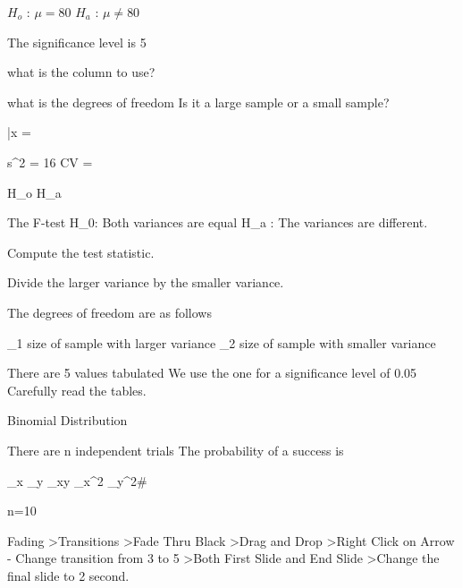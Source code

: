 $H_o$  : $\mu = 80 $
$H_a$  : $\mu \neq 80$ 

The significance level is 5%

what is the column to use?

what is the degrees of freedom 
Is it a large sample or a small sample?


\bar{x} = 

s^2 = 16
CV = 








H_o
H_a

The F-test
H_0: Both variances are equal
H_a : The variances are different.

Compute the test statistic.

Divide the larger variance by the smaller variance.

The degrees of freedom are as follows
 
\nu_1 size of sample with larger variance
\nu_2 size of sample with smaller variance


There are 5 values tabulated
We use the one for a significance level of 0.05
Carefully read the tables.


Binomial Distribution

There are n independent trials
The probability of a success is

\sum_x
\sum_y
\sum_xy
\sum_x^2
\sum_y^2#

n=10






Fading
>Transitions
>Fade Thru Black
>Drag and Drop
>Right Click on Arrow - Change transition from 3 to 5
>Both First Slide and End Slide
>Change the final slide to 2 second.
